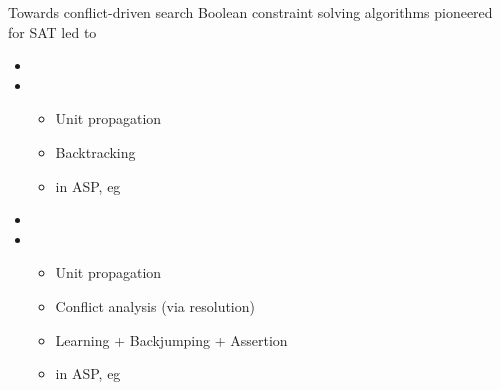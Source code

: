 \begin{frame}{Towards conflict-driven search}
  \medskip
  Boolean constraint solving algorithms pioneered for SAT led to
  \smallskip
  \begin{itemize}
  \item<1-> 
  \item<1-> [] 
    \begin{itemize}\normalsize
    \item Unit propagation
    \item Backtracking
    \smallskip
    \item in ASP, eg \smodels\
    \end{itemize}
  \medskip
  \item<1-> 
  \item<1-> [] 
    \begin{itemize}\normalsize
    \item Unit propagation
    \item Conflict analysis (via resolution)
    \item Learning + Backjumping + Assertion
    \smallskip
    \item in ASP, eg \clasp\
    \end{itemize}
  \end{itemize}
\end{frame}
%
